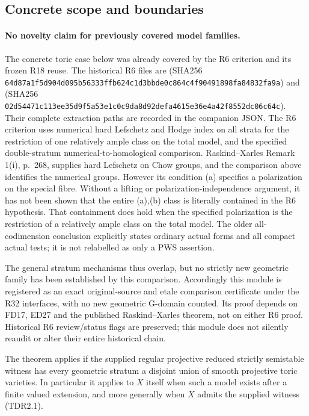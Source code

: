 \subsection{Concrete scope and boundaries}

\paragraph{No novelty claim for previously covered model families.}
The concrete toric case below was already covered by the R6 criterion
and its frozen R18 reuse. The historical R6 files are
(SHA256 \texttt{64d87a1f5d904d095b56333ffb624c1d3bbde0c864c4f90491898fa84832fa9a})
and 
(SHA256 \texttt{02d54471c113ee35d9f5a53e1c0c9da8d92defa4615e36e4a42f8552dc06c64c}).
Their complete extraction paths are recorded in the companion JSON.
The R6 criterion uses numerical hard Lefschetz and Hodge index on
all strata for the restriction of one relatively ample class on the
total model, and the specified double-stratum numerical-to-homological
comparison. Raskind--Xarles Remark 1(i), p.~268, supplies hard
Lefschetz on Chow groups, and the comparison above identifies the
numerical groups. However its condition (a) specifies a polarization
on the special fibre. Without a lifting or polarization-independence
argument, it has not been shown that the entire (a),(b) class is
literally contained in the R6 hypothesis. That containment does hold
when the specified polarization is the restriction of a relatively
ample class on the total model. The older all-codimension conclusion explicitly
states ordinary actual forms and all compact actual tests; it is not
relabelled as only a PWS assertion.

The general stratum mechanisms thus overlap, but no strictly new
geometric family has been established by this comparison. Accordingly
this module is registered as an exact original-source and etale
comparison certificate under the R32 interfaces, with no new geometric
G-domain counted. Its proof depends on FD17, ED27 and the
published Raskind--Xarles theorem, not on either R6 proof. Historical
R6 review/status flags are preserved; this module does not silently
reaudit or alter their entire historical chain.

\begin{corollary}
\label{sc2td:toric}
The theorem applies if the supplied regular projective reduced strictly
semistable witness has every geometric stratum a disjoint union of
smooth projective toric varieties. In particular it applies to $X$
itself when such a model exists after a finite valued extension, and
more generally when $X$ admits the supplied witness (TDR2.1).
\end{corollary}

